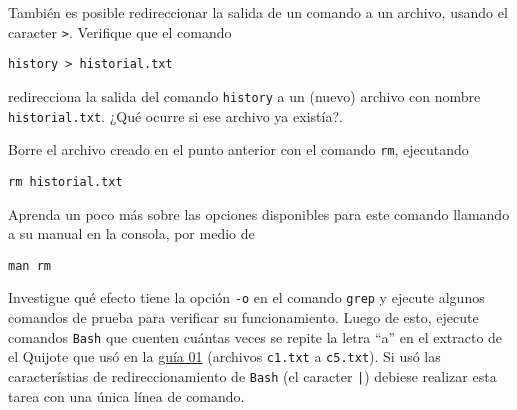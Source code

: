 \documentclass[11pt]{exam}
\begin{document}
\begin{questions}
\item También es posible redireccionar la salida de un comando a un archivo, usando el caracter \texttt{>}. Verifique que el comando
\begin{verbatim}
history > historial.txt
\end{verbatim}
redirecciona la salida del comando \texttt{history} a un (nuevo) archivo con nombre \texttt{historial.txt}. ¿Qué ocurre si ese archivo ya existía?.

\item Borre el archivo creado en el punto anterior con el comando \texttt{rm}, ejecutando
\begin{verbatim}
rm historial.txt
\end{verbatim}
Aprenda un poco más sobre las opciones disponibles para este comando llamando a su manual en la consola, por medio de
\begin{verbatim}
man rm
\end{verbatim}
\item Investigue qué efecto tiene la opción \texttt{-o} en el comando \texttt{grep} y ejecute algunos comandos de prueba para verificar su funcionamiento. Luego de esto, ejecute comandos \texttt{Bash} que cuenten cuántas veces se repite la letra ``a'' en el extracto de el Quijote que usó en la \href{https://github.com/gfrubi/CC/tree/master/guias/01}{guía 01} (archivos \texttt{c1.txt} a \texttt{c5.txt}). Si usó las característias de redireccionamiento de \texttt{Bash} (el caracter \texttt{|}) debiese realizar esta tarea con una única línea de comando.


\end{questions}
\end{document}

